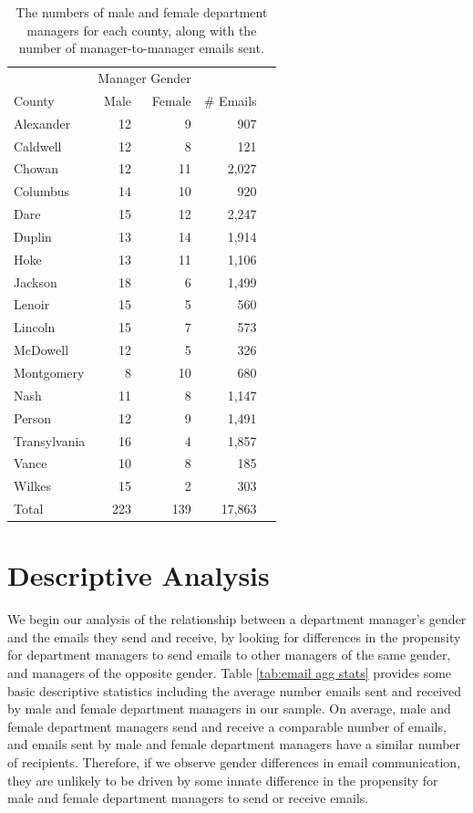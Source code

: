 \documentclass{pnastwo}
\begin{document}
\begin{article}
\begin{table}
  \centering
  \begin{tabular}{lrrrr}
    \toprule
    & \multicolumn{2}{c}{Manager Gender} & \\
    \cmidrule{2-3}
    County & Male & Female & \# Emails  \\
    \midrule
    Alexander & 12 & 9 & 907   \\
    Caldwell & 12 & 8 & 121     \\
    Chowan & 12 & 11 & 2,027   \\
    Columbus & 14 & 10 & 920   \\
    Dare & 15 & 12 & 2,247    \\
    Duplin & 13 & 14 & 1,914    \\
    Hoke & 13 & 11 & 1,106  \\
    Jackson & 18 & 6 & 1,499    \\
    Lenoir & 15 & 5 & 560  \\
    Lincoln & 15 & 7 & 573   \\
    McDowell & 12 & 5 & 326   \\
    Montgomery & 8 & 10 & 680   \\
    Nash & 11 & 8 & 1,147  \\
    Person & 12 & 9 & 1,491   \\
    Transylvania & 16 & 4 & 1,857  \\
    Vance & 10 & 8 & 185   \\
    Wilkes & 15 & 2 & 303   \\
    \midrule
    Total & 223 & 139 & 17,863 \\
    \bottomrule
  \end{tabular}
  \caption{\label{tab:county aggregate stats} The numbers of male and
    female department managers for each county, along with the number
    of manager-to-manager emails sent.}
\end{table}



\section{Descriptive Analysis}

We begin our analysis of the relationship between a department manager's gender and the emails they send and receive, by looking for differences in the propensity for department managers to send emails to other managers of the same gender, and managers of the opposite gender. Table \ref{tab:email agg stats} provides some basic descriptive statistics including the average number emails sent and received by male and female department managers in our sample. On average, male and female department managers send and receive a comparable number of emails, and emails sent by male and female department managers have a similar number of recipients. Therefore, if we observe gender differences in email communication, they are unlikely to be driven by some innate difference in the propensity for male and female department managers to send or receive emails. 
	

\end{article}
\end{document}
